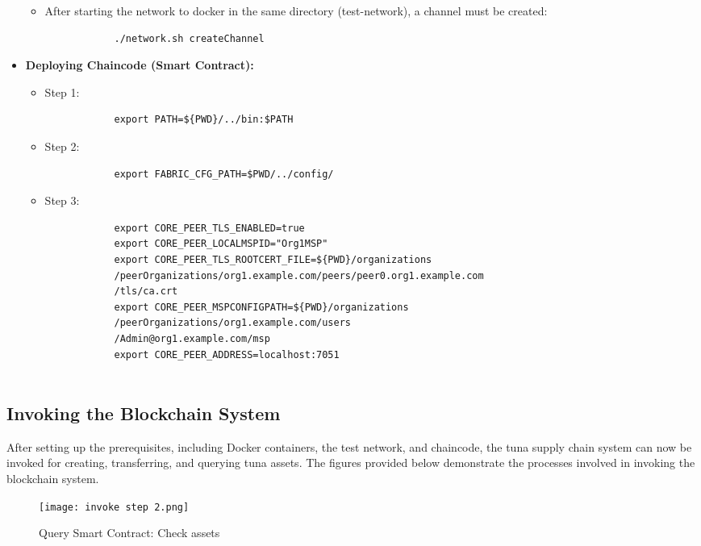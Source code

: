 \begin{itemize}
\begin{itemize}
		\item After starting the network to docker in the same directory (test-network), a channel must be created:
		\begin{verbatim}
			./network.sh createChannel
		\end{verbatim}
		
	\end{itemize}
	
	\item \textbf{Deploying Chaincode (Smart Contract):}
	\begin{itemize}
		\item Step 1:
		\begin{verbatim}
			export PATH=${PWD}/../bin:$PATH
		\end{verbatim}
		
		\item Step 2:
		\begin{verbatim}
			export FABRIC_CFG_PATH=$PWD/../config/
		\end{verbatim}
		
		\item Step 3:
		\begin{verbatim}
			export CORE_PEER_TLS_ENABLED=true
			export CORE_PEER_LOCALMSPID="Org1MSP"
			export CORE_PEER_TLS_ROOTCERT_FILE=${PWD}/organizations
			/peerOrganizations/org1.example.com/peers/peer0.org1.example.com
			/tls/ca.crt
			export CORE_PEER_MSPCONFIGPATH=${PWD}/organizations
			/peerOrganizations/org1.example.com/users
			/Admin@org1.example.com/msp
			export CORE_PEER_ADDRESS=localhost:7051
			
		\end{verbatim}
		
	\end{itemize}
	
	
\end{itemize}

\subsection{Invoking the Blockchain System}

After setting up the prerequisites, including Docker containers, the test network, and chaincode, the tuna supply chain system can now be invoked for creating, transferring, and querying tuna assets. The figures provided below demonstrate the processes involved in invoking the blockchain system.

	  \begin{figure}[H]
		\centering
		\texttt{[image: invoke step 2.png]}
		\caption{Query Smart Contract: Check assets}
		\label{fig: second step}
	\end{figure}
	
